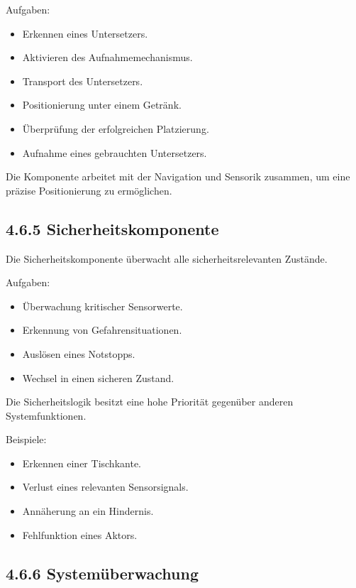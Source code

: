 \documentclass[
]{article}
\providecommand{\tightlist}{%
  \setlength{\itemsep}{0pt}\setlength{\parskip}{0pt}}
\begin{document}
Aufgaben:

\begin{itemize}
\tightlist
\item
  Erkennen eines Untersetzers.
\item
  Aktivieren des Aufnahmemechanismus.
\item
  Transport des Untersetzers.
\item
  Positionierung unter einem Getränk.
\item
  Überprüfung der erfolgreichen Platzierung.
\item
  Aufnahme eines gebrauchten Untersetzers.
\end{itemize}

Die Komponente arbeitet mit der Navigation und Sensorik zusammen, um
eine präzise Positionierung zu ermöglichen.

\subsection{4.6.5 Sicherheitskomponente}\label{sicherheitskomponente-1}

Die Sicherheitskomponente überwacht alle sicherheitsrelevanten Zustände.

Aufgaben:

\begin{itemize}
\tightlist
\item
  Überwachung kritischer Sensorwerte.
\item
  Erkennung von Gefahrensituationen.
\item
  Auslösen eines Notstopps.
\item
  Wechsel in einen sicheren Zustand.
\end{itemize}

Die Sicherheitslogik besitzt eine hohe Priorität gegenüber anderen
Systemfunktionen.

Beispiele:

\begin{itemize}
\tightlist
\item
  Erkennen einer Tischkante.
\item
  Verlust eines relevanten Sensorsignals.
\item
  Annäherung an ein Hindernis.
\item
  Fehlfunktion eines Aktors.
\end{itemize}

\subsection{4.6.6 Systemüberwachung}\label{systemuxfcberwachung-1}
\end{document}

